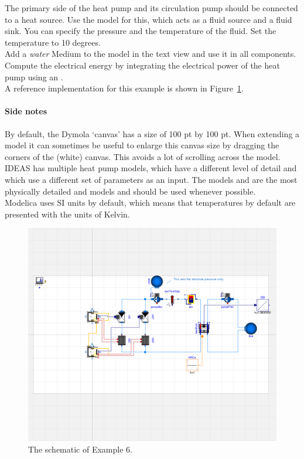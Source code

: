 \documentclass[10pt,a4paper]{article}
\begin{document}
The primary side of the heat pump and its circulation pump should be connected
to a heat source. Use the model  for this,
which acts as a fluid source and a fluid sink. You can specify the pressure
and the temperature of the fluid. Set the temperature to 10 degrees.\\

Add a \textit{water} Medium to the model 
in the text view and use it in all components.\\


Compute the electrical energy by integrating the electrical power of the heat pump
using an .\\

A reference implementation for this example is shown in Figure~\ref{fig:sche}.

\paragraph{Side notes}
By default, the Dymola `canvas' has a size of 100 pt by 100 pt. 
When extending a model  it can sometimes be useful to enlarge this canvas size by dragging
the corners of the (white) canvas. 
This avoids a lot of scrolling across the model.\\

IDEAS has multiple heat pump models, which have a different level of detail
and which use a different set of parameters as an input.
The models 
and  are
the most physically detailed and models and should be used whenever possible.\\

Modelica uses SI units by default, which means that temperatures by default 
are presented with the units of Kelvin.



\begin{figure}
\centering
\includegraphics[width=\linewidth]{Schematic6.png}
\caption{The schematic of Example 6.}
\label{fig:sche}
\end{figure}
\end{document}
